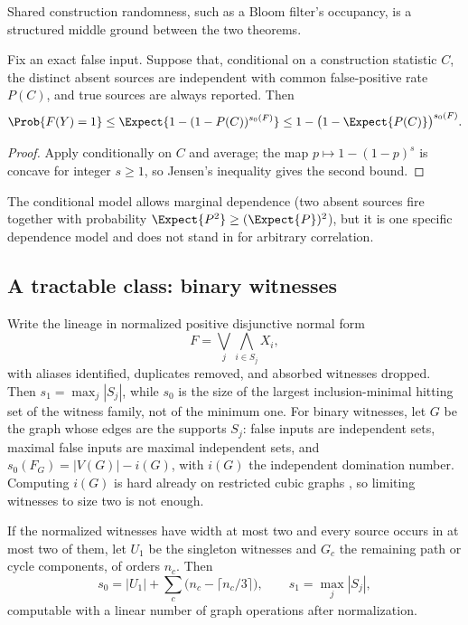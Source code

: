 Shared construction randomness, such as a Bloom filter's occupancy, is a
structured middle ground between the two theorems.

\begin{corollary}
\label{cor:query-contract-shared}
Fix an exact false input. Suppose that, conditional on a construction statistic
$C$, the distinct absent sources are independent with common false-positive rate
$P(C)$, and true sources are always reported. Then
\[
  \Prob{F(Y) = 1}
  \le \Expect{1 - (1 - P(C))^{s_0(F)}}
  \le 1 - \bigl(1 - \Expect{P(C)}\bigr)^{s_0(F)}.
\]
\end{corollary}

\begin{proof}
Apply  conditionally on $C$ and average; the map $p
\mapsto 1 - (1 - p)^{s}$ is concave for integer $s \ge 1$, so Jensen's inequality
gives the second bound.
\end{proof}

The conditional model allows marginal dependence (two absent sources fire together
with probability $\Expect{P^2} \ge (\Expect{P})^2$), but it is one specific
dependence model and does not stand in for arbitrary correlation.

\subsection*{A tractable class: binary witnesses}

Write the lineage in normalized positive disjunctive normal form
\[
  F = \bigvee_j \bigwedge_{i \in S_j} X_i,
\]
with aliases identified, duplicates removed, and absorbed witnesses dropped. Then
$s_1 = \max_j |S_j|$, while $s_0$ is the size of the largest inclusion-minimal
hitting set of the witness family, not of the minimum one.
For binary witnesses, let $G$ be the graph whose edges are the supports $S_j$:
false inputs are independent sets, maximal false inputs are maximal independent
sets, and $s_0(F_G) = |V(G)| - i(G)$, with $i(G)$ the independent domination
number. Computing $i(G)$ is hard already
on restricted cubic graphs \parencite{liu-poon-lin-2015}, so limiting witnesses to
size two is not enough.

\begin{theorem}
\label{thm:query-contract-cycles}
If the normalized witnesses have width at most two and every source occurs in at
most two of them, let $U_1$ be the singleton witnesses and $G_c$ the remaining path
or cycle components, of orders $n_c$. Then
\[
  s_0 = |U_1| + \sum_c \bigl(n_c - \lceil n_c / 3 \rceil\bigr),
  \qquad
  s_1 = \max_j |S_j|,
\]
computable with a linear number of graph operations after normalization.
\end{theorem}

